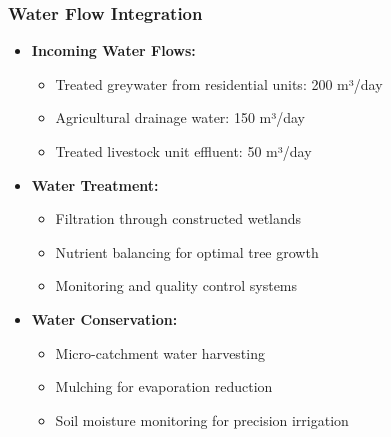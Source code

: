 \subsubsection{Water Flow Integration}
\begin{itemize}
    \item \textbf{Incoming Water Flows:}
    \begin{itemize}
        \item Treated greywater from residential units: 200 m³/day
        \item Agricultural drainage water: 150 m³/day
        \item Treated livestock unit effluent: 50 m³/day
    \end{itemize}
    \item \textbf{Water Treatment:}
    \begin{itemize}
        \item Filtration through constructed wetlands
        \item Nutrient balancing for optimal tree growth
        \item Monitoring and quality control systems
    \end{itemize}
    \item \textbf{Water Conservation:}
    \begin{itemize}
        \item Micro-catchment water harvesting
        \item Mulching for evaporation reduction
        \item Soil moisture monitoring for precision irrigation
    \end{itemize}
\end{itemize}

